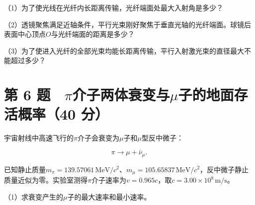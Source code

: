 \documentclass[12pt,a4paper,fontset=fandol]{ctexart}
\begin{document}
（1）为了使光线在光纤内长距离传输，光纤端面处最大入射角是多少？

（2）透镜聚焦满足近轴条件，平行光束刚好聚焦于垂直光轴的光纤端面。球镜后表面中心顶点\(O\)与光纤端面的距离是多少？

（3）为了使进入光纤的全部光束均能长距离传输，平行入射激光束的直径最大不能超过多少？

\clearpage

\section{\texorpdfstring{第 6
题　\(\pi\)介子两体衰变与\(\mu\)子的地面存活概率（40
分）}{第 6 题　\textbackslash pi介子两体衰变与\textbackslash mu子的地面存活概率（40 分）}}\label{ux7b2c-6-ux9898-piux4ecbux5b50ux4e24ux4f53ux8870ux53d8ux4e0emuux5b50ux7684ux5730ux9762ux5b58ux6d3bux6982ux738740-ux5206}

宇宙射线中高速飞行的\(\pi\)介子会衰变为\(\mu\)子和\(\mu\)型反中微子：

\[
\pi\longrightarrow\mu+\bar\nu_\mu.
\]

已知静止质量\(m_\pi=139.57061\,\mathrm{MeV}/c^2\)、\(m_\mu=105.65837\,\mathrm{MeV}/c^2\)，反中微子静止质量近似为零。实验室测得\(\pi\)介子速率为\(v=0.965c\)，取\(c=3.00\times10^8\,\mathrm{m/s}\)。

\begin{center}
\begin{minipage}{\linewidth}
\centering\begingroup{}
\ifdim\wd\diagrambox>.88\linewidth
\sbox{\diagrambox}{\resizebox{.88\linewidth}{!}{\usebox{\diagrambox}}}\fi
\ifdim\ht\diagrambox>.20\textheight
\resizebox{!}{.20\textheight}{\usebox{\diagrambox}}
\else\usebox{\diagrambox}\fi
\par{}\endgroup\end{minipage}\end{center}

（1）求衰变产生的\(\mu\)子的最大速率和最小速率。
\end{document}
